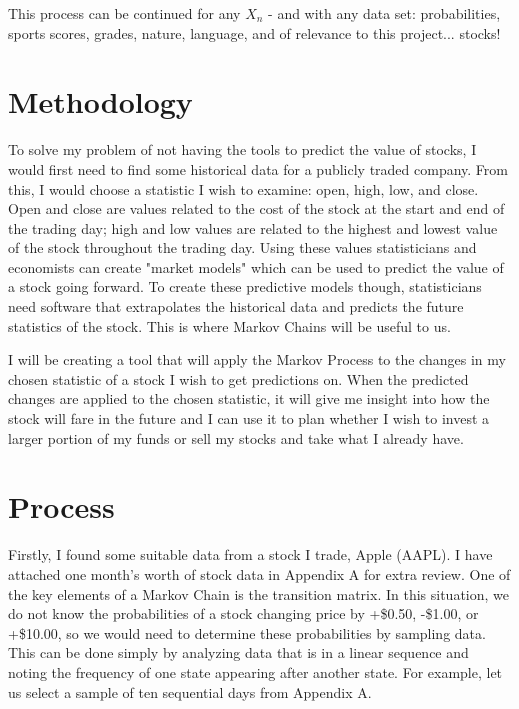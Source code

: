 \documentclass[12pt,final]{article}
\begin{document}
This process can be continued for any $X_n$ - and with any data set: probabilities, sports scores,
grades, nature, language, and of relevance to this project... stocks!

\section{Methodology}

To solve my problem of not having the tools to predict the value of stocks, I would first need to
find some historical data for a publicly traded company. From this, I would choose a statistic
I wish to examine: open, high, low, and close. Open and close are values related to the cost of the
stock at the start and end of the trading day; high and low values are related to the highest and
lowest value of the stock throughout the trading day. Using these values statisticians and economists
can create "market models" which can be used to predict the value of a stock going forward. To create
these predictive models though, statisticians need software that extrapolates the historical data and predicts
the future statistics of the stock. This is where Markov Chains will be useful to us.

I will be creating a tool that will apply the Markov Process to the changes in my chosen statistic of
a stock I wish to get predictions on. When the predicted changes are applied to the chosen statistic,
it will give me insight into how the stock will fare in the future and I can use it to plan whether I wish
to invest a larger portion of my funds or sell my stocks and take what I already have.

\section{Process}

Firstly, I found some suitable data from a stock I trade, Apple (AAPL). I have attached one month's
worth of stock data in Appendix A for extra review. One of the key elements of a Markov Chain is the
transition matrix. In this situation, we do not know the probabilities of a stock changing price by +\$0.50,
-\$1.00, or +\$10.00, so we would need to determine these probabilities by sampling data. This can be
done simply by analyzing data that is in a linear sequence and noting the frequency of one state
appearing after another state. For example, let us select a sample of ten sequential days from
Appendix A.
\end{document}
